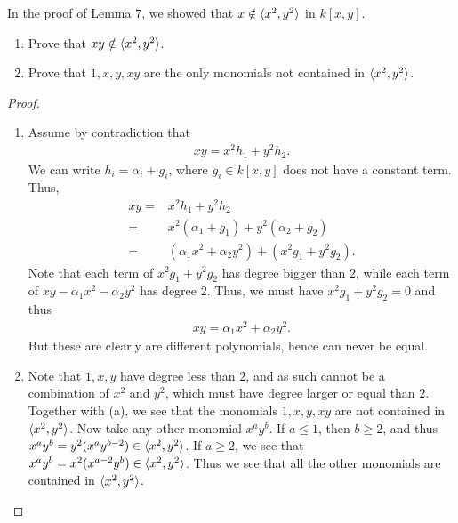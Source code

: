 \begin{exercise}{17}
In the proof of Lemma $7$, we showed that $x\notin \langle x^2,y^2\rangle$ in $k[x,y]$.
\begin{enumerate}
    \item Prove that $xy\notin \langle x^2,y^2\rangle$.
    \item Prove that $1, x, y, xy$ are the only monomials not contained in $\langle x^2, y^2\rangle$.
\end{enumerate}
\end{exercise}
\begin{proof}
    \begin{enumerate}
        \item Assume by contradiction that
        \begin{align*}
            xy = x^2 h_1 + y^2 h_2.
        \end{align*}
        We can write $h_i = \alpha_i + g_i$, where $g_i\in k[x,y]$ does not have a constant term. 
        Thus,
        \begin{align*}
            xy
            =& x^2 h_1 + y^2 h_2\\
            =& x^2 (\alpha_1 + g_1) + y^2 (\alpha_2 + g_2)\\
            =& (\alpha_1 x^2 + \alpha_2 y^2) + (x^2 g_1 + y^2 g_2).
        \end{align*}
        Note that each term of $x^2 g_1 + y^2 g_2$ has degree bigger than $2$, while each term of $xy - \alpha_1 x^2 - \alpha_2 y^2$ has degree $2$. 
        Thus, we must have $x^2 g_1 + y^2 g_2 = 0$ and thus
        \begin{align*}
            xy = \alpha_1 x^2 + \alpha_2 y^2.
        \end{align*}
        But these are clearly are different polynomials, hence can never be equal.
        \item Note that $1,x,y$ have degree less than $2$, and as such cannot be a combination of $x^2$ and $y^2$, which must have degree larger or equal than $2$. 
        Together with (a), we see that the monomials $1,x,y,xy$ are not contained in $\langle x^2, y^2\rangle$. 
        Now take any other monomial $x^a y^b$. 
        If $a\leq 1$, then $b\geq 2$, and thus $x^a y^b = y^2 (x^a y^{b-2})\in \langle x^2,y^2\rangle$. 
        If $a\geq 2$, we see that $x^a y^b = x^2 (x^{a-2} y^b)\in \langle x^2, y^2\rangle$. 
        Thus we see that all the other monomials are contained in $\langle x^2, y^2\rangle$.
    \end{enumerate}
\end{proof}

